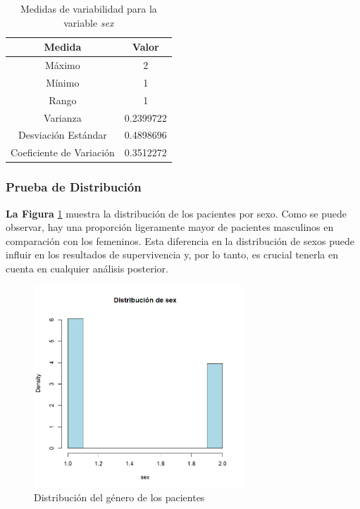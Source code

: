 \documentclass[a4paper,12pt]{article}
\begin{document}
\begin{table}[h!]
    \centering
    \begin{tabular}{|c|c|}
        \hline
        \textbf{Medida} & \textbf{Valor} \\
        \hline
        Máximo & 2 \\
        \hline
        Mínimo & 1 \\
        \hline
        Rango & 1 \\
        \hline
        Varianza & 0.2399722 \\
        \hline
        Desviación Estándar & 0.4898696 \\
        \hline
        Coeficiente de Variación & 0.3512272 \\
        \hline
    \end{tabular}
    \caption{Medidas de variabilidad para la variable \textit{sex}}
    \label{tab:medidas_variabilidad_sex}
\end{table}
    
 \newpage

    \subsubsection*{Prueba de Distribución}

    \textbf{La Figura }\ref{fig:sex_distribution} muestra la distribución de los pacientes por sexo. Como se puede observar, hay una proporción ligeramente mayor de pacientes masculinos en comparación con los femeninos. Esta diferencia en la distribución de sexos puede influir en los resultados de supervivencia y, por lo tanto, es crucial tenerla en cuenta en cualquier análisis posterior.

    \begin{figure}[h]
        \centering
        \includegraphics[width=0.7\textwidth]{distribucion_sex.png}
        \caption{Distribución del género de los pacientes}
        \label{fig:sex_distribution}
    \end{figure}
\end{document}
